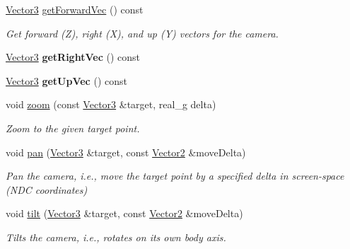 \begin{Indent}
\begin{DoxyCompactItemize}
\mbox{\label{classrev_1_1_camera_ad2a8c31e8759bdcc816719e3e63c97b6}} 
\mbox{\hyperlink{classrev_1_1_vector}{Vector3}} \mbox{\hyperlink{classrev_1_1_camera_ad2a8c31e8759bdcc816719e3e63c97b6}{get\+Forward\+Vec}} () const
\begin{DoxyCompactList}\small\item\em Get forward (Z), right (X), and up (Y) vectors for the camera. \end{DoxyCompactList}\item 
\mbox{\label{classrev_1_1_camera_ab4e63b181e61c322cd2c9fcf17b07d82}} 
\mbox{\hyperlink{classrev_1_1_vector}{Vector3}} {\bfseries get\+Right\+Vec} () const
\item 
\mbox{\label{classrev_1_1_camera_a5254225acf6686a8251dadf54cb0906a}} 
\mbox{\hyperlink{classrev_1_1_vector}{Vector3}} {\bfseries get\+Up\+Vec} () const
\item 
\mbox{\label{classrev_1_1_camera_a8795d2c09cac5eaf7684b6f4bd26f4e7}} 
void \mbox{\hyperlink{classrev_1_1_camera_a8795d2c09cac5eaf7684b6f4bd26f4e7}{zoom}} (const \mbox{\hyperlink{classrev_1_1_vector}{Vector3}} \&target, real\+\_\+g delta)
\begin{DoxyCompactList}\small\item\em Zoom to the given target point. \end{DoxyCompactList}\item 
void \mbox{\hyperlink{classrev_1_1_camera_a5c894cef5f6e9f7e93be757fcceff737}{pan}} (\mbox{\hyperlink{classrev_1_1_vector}{Vector3}} \&target, const \mbox{\hyperlink{classrev_1_1_vector}{Vector2}} \&move\+Delta)
\begin{DoxyCompactList}\small\item\em Pan the camera, i.\+e., move the target point by a specified delta in screen-\/space (N\+DC coordinates) \end{DoxyCompactList}\item 
\mbox{\label{classrev_1_1_camera_a541ef0df376f1ec5b892bb8c26959149}} 
void \mbox{\hyperlink{classrev_1_1_camera_a541ef0df376f1ec5b892bb8c26959149}{tilt}} (\mbox{\hyperlink{classrev_1_1_vector}{Vector3}} \&target, const \mbox{\hyperlink{classrev_1_1_vector}{Vector2}} \&move\+Delta)
\begin{DoxyCompactList}\small\item\em Tilts the camera, i.\+e., rotates on its own body axis. \end{DoxyCompactList}\item 

\end{DoxyCompactItemize}
\end{Indent}
